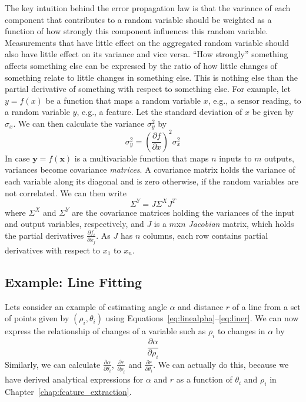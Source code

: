 The key intuition behind the error propagation law is that the variance of each component that contributes to a random variable should be weighted as a function of how strongly this component influences this random variable. Measurements that have little effect on the aggregated random variable should also have little effect on its variance and vice versa. ``How strongly'' something affects something else can be expressed by the ratio of how little changes of something relate to little changes in something else. This is nothing else than the partial derivative of something with respect to something else. For example, let $y=f(x)$ be a function that maps a random variable $x$, e.g., a sensor reading, to a random variable $y$, e.g., a feature. Let the standard deviation of $x$ be given by $\sigma_x$. We can then calculate the variance $\sigma_y^2$ by
\begin{equation}
\sigma_y^2=\left(\frac{\partial f}{\partial x}\right)^2 \sigma_x^2
\end{equation}
In case $\mathbf{y}=f(\mathbf{x})$ is a multivariable function that maps $n$ inputs to $m$ outputs, variances become covariance \emph{matrices}. A covariance matrix holds the variance of each variable along its diagonal and is zero otherwise, if the random variables are not correlated. We can then write
\begin{equation}
\Sigma^Y= J \Sigma^X J^T
\end{equation}
where $\Sigma^X$ and $\Sigma^Y$ are the covariance matrices holding the variances of the input and output variables, respectively, and $J$ is a $m$x$n$ \emph{Jacobian} matrix, which holds the partial derivatives $\frac{\partial f_i}{\partial x_j}$. As $J$ has $n$ columns, each row contains partial derivatives with respect to $x_1$ to $x_n$.

\subsection{Example: Line Fitting}\label{sec:linefitting}
Lets consider an example of estimating angle $ \alpha$ and distance $ r$ of a line from a set of points given by $ (\rho_i,\theta_i)$ using Equations~\ref{eq:linealpha}--\ref{eq:liner}. We can now express the relationship of changes of a variable such as $ \rho_i$ to changes in $ \alpha$ by
\begin{equation}
\frac{\partial \alpha}{\partial \rho_i}
\end{equation}
Similarly, we can calculate $ \frac{\partial \alpha}{\partial \theta_i}$, $ \frac{\partial r}{\partial \rho_i}$ and $ \frac{\partial r}{\partial \theta_i}$. We can actually do this, because we have derived analytical expressions for $ \alpha$ and $ r$ as a function of $ \theta_i$ and $ \rho_i$ in Chapter~\ref{chap:feature_extraction}.

